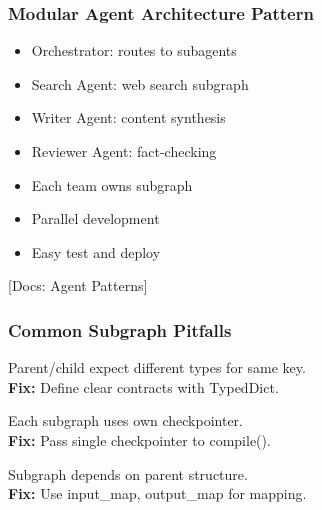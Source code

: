 \documentclass[aspectratio=169,11pt]{beamer}
\newcommand{\docref}[1]{{\scriptsize\color{docgray}[Docs: #1]}}
\begin{document}
\begin{frame}
\frametitle{Modular Agent Architecture Pattern}
\begin{conceptbox}
\setlength{\itemsep}{1pt}
\begin{itemize}
\item Orchestrator: routes to subagents
\item Search Agent: web search subgraph
\item Writer Agent: content synthesis
\item Reviewer Agent: fact-checking
\end{itemize}
\end{conceptbox}
\vspace{0.1cm}
\begin{tipbox}[Benefits]
\setlength{\itemsep}{1pt}
\begin{itemize}
\item Each team owns subgraph
\item Parallel development
\item Easy test and deploy
\end{itemize}
\end{tipbox}
\docref{Agent Patterns}
\end{frame}

\begin{frame}
\frametitle{Common Subgraph Pitfalls}
\begin{warningbox}
Parent/child expect different types for same key.\\
\textbf{Fix:} Define clear contracts with TypedDict.
\end{warningbox}
\vspace{0.08cm}
\begin{warningbox}
Each subgraph uses own checkpointer.\\
\textbf{Fix:} Pass single checkpointer to compile().
\end{warningbox}
\vspace{0.08cm}
\begin{warningbox}
Subgraph depends on parent structure.\\
\textbf{Fix:} Use input\_map, output\_map for mapping.
\end{warningbox}
\end{frame}
\end{document}
